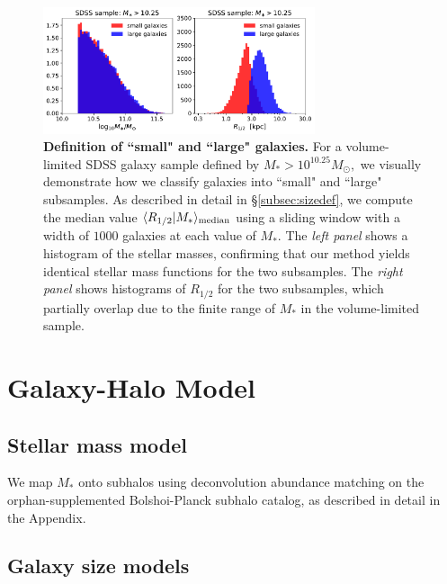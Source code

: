 \documentclass[usenatbib,usegraphicx,letterpaper]{mn2e}
\newcommand{\rhalf}{R_{1/2}}
\newcommand{\mstar}{M_{\ast}}
\newcommand{\mvir}{M_{\rm vir}}
\newcommand{\mpeak}{M_{\rm peak}}
\newcommand{\mhalo}{M_{\rm halo}}
\newcommand{\median}[2]{\langle{#1}\vert{#2}\rangle_{\rm median}}
\begin{document}
\begin{figure}
\centering
\includegraphics[width=8cm]{FIGS/sdss_small_large_sample_definitions.pdf}
\caption{
{\bf Definition of ``small" and ``large" galaxies.} For a volume-limited SDSS galaxy sample defined by $M_{\ast}>10^{10.25}M_{\odot},$ we visually demonstrate how we classify galaxies into ``small" and ``large" subsamples. As described in detail in \S\ref{subsec:sizedef}, we compute the median value $\median{\rhalf}{\mstar}$ using a sliding window with a width of $1000$ galaxies at each value of $\mstar.$ The {\em left panel} shows a histogram of the stellar masses, confirming that our method yields identical stellar mass functions for the two subsamples. The {\em right panel} shows histograms of $\rhalf$ for the two subsamples, which partially overlap due to the finite range of $\mstar$ in the volume-limited sample. 
}
\label{fig:sizedefinition}
\end{figure}

\section{Galaxy-Halo Model}
\label{sec:model}

\subsection{Stellar mass model}
\label{subsec:smhm}

We map $\mstar$ onto subhalos using deconvolution abundance matching on the orphan-supplemented Bolshoi-Planck subhalo catalog, as described in detail in the Appendix. 


\subsection{Galaxy size models}
\label{subsec:model}
\end{document}
